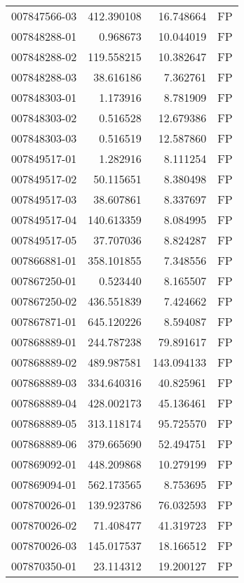 \begin{tabular}{lrrl}
007847566-03 &  412.390108 &      16.748664 &   FP \\
007848288-01 &    0.968673 &      10.044019 &   FP \\
007848288-02 &  119.558215 &      10.382647 &   FP \\
007848288-03 &   38.616186 &       7.362761 &   FP \\
007848303-01 &    1.173916 &       8.781909 &   FP \\
007848303-02 &    0.516528 &      12.679386 &   FP \\
007848303-03 &    0.516519 &      12.587860 &   FP \\
007849517-01 &    1.282916 &       8.111254 &   FP \\
007849517-02 &   50.115651 &       8.380498 &   FP \\
007849517-03 &   38.607861 &       8.337697 &   FP \\
007849517-04 &  140.613359 &       8.084995 &   FP \\
007849517-05 &   37.707036 &       8.824287 &   FP \\
007866881-01 &  358.101855 &       7.348556 &   FP \\
007867250-01 &    0.523440 &       8.165507 &   FP \\
007867250-02 &  436.551839 &       7.424662 &   FP \\
007867871-01 &  645.120226 &       8.594087 &   FP \\
007868889-01 &  244.787238 &      79.891617 &   FP \\
007868889-02 &  489.987581 &     143.094133 &   FP \\
007868889-03 &  334.640316 &      40.825961 &   FP \\
007868889-04 &  428.002173 &      45.136461 &   FP \\
007868889-05 &  313.118174 &      95.725570 &   FP \\
007868889-06 &  379.665690 &      52.494751 &   FP \\
007869092-01 &  448.209868 &      10.279199 &   FP \\
007869094-01 &  562.173565 &       8.753695 &   FP \\
007870026-01 &  139.923786 &      76.032593 &   FP \\
007870026-02 &   71.408477 &      41.319723 &   FP \\
007870026-03 &  145.017537 &      18.166512 &   FP \\
007870350-01 &   23.114312 &      19.200127 &   FP \\

\end{tabular}
